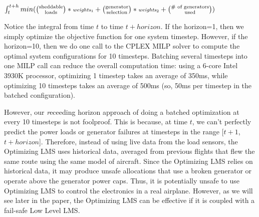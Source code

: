 \documentclass{acm_proc_article-sp}
\newcommand*{\bfrac}[2]{\genfrac{(}{)}{0pt}{}{#1}{#2}} %
\begin{document}
$\int_t^{t+h} min(\bfrac{\text{sheddable}}{\text{loads}} * \text{\scriptsize \emph{weights}$_1$} +  \bfrac{\text{generator}}{\text{selection}} * \text{\scriptsize \emph{weights}$_2$} +  \bfrac{\text{\scriptsize \# of generators}}{\text{\scriptsize  used}})$

Notice the integral from time $t$ to time $t+horizon$. 
If the horizon=1, then we simply optimize the objective function for one system timestep.
However, if the horizon=10, then we do one call to the CPLEX MILP solver to compute the optimal system configurations for 10 timesteps.
Batching several timesteps into one MILP call can reduce the overall computation time: using a 6-core Intel 3930K processor, optimizing 1 timestep takes an average of 350ms, while optimizing 10 timesteps takes an average of 500ms (so, 50ms per timestep in the batched configuration).

However, our {\emph receeding horizon} approach of doing a batched optimization at every 10 timesteps is not foolproof.
This is because, at time $t$, we can't perfectly predict the power loads or generator failures at timesteps in the range [$t+1$, $t+horizon$]. 
Therefore, instead of using live data from the load sensors, the Optimizing LMS uses historical data, averaged from previous flights that flew the same route using the same model of aircraft.
Since the Optimizing LMS relies on historical data, it may produce unsafe allocations that use a broken generator or operate above the generator power caps.
Thus, it is potentially unsafe to use Optimizing LMS to control the electronics in a real airplane. 
However, as we will see later in the paper, the Optimizing LMS can be effective if it is coupled with a fail-safe Low Level LMS.
\end{document}

